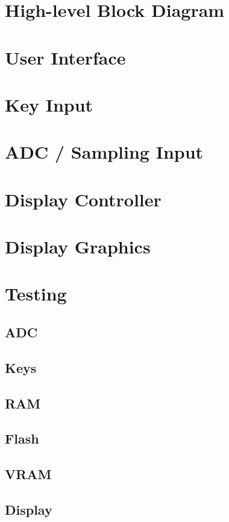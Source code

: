 \section{High-level Block Diagram}

\section{User Interface}

\section{Key Input}

\section{ADC / Sampling Input}

\section{Display Controller}

\section{Display Graphics}

\section{Testing}

\subsection{ADC}

\subsection{Keys}

\subsection{RAM}

\subsection{Flash}

\subsection{VRAM}

\subsection{Display}
